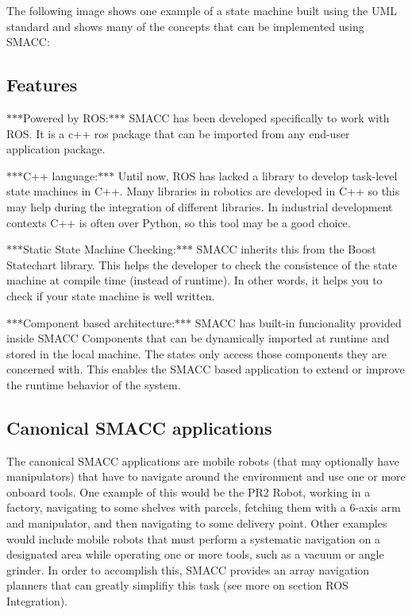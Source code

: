 The following image shows one example of a state machine built using the U\+ML standard and shows many of the concepts that can be implemented using S\+M\+A\+CC\+: 

 

\subsection*{Features}


\begin{DoxyItemize}
\item $\ast$$\ast$$\ast$\+Powered by R\+OS\+:$\ast$$\ast$$\ast$ S\+M\+A\+CC has been developed specifically to work with R\+OS. It is a c++ ros package that can be imported from any end-\/user application package.
\item $\ast$$\ast$$\ast$\+C++ language\+:$\ast$$\ast$$\ast$ Until now, R\+OS has lacked a library to develop task-\/level state machines in C++. Many libraries in robotics are developed in C++ so this may help during the integration of different libraries. In industrial development contexts C++ is often over Python, so this tool may be a good choice.
\item $\ast$$\ast$$\ast$\+Static State Machine Checking\+:$\ast$$\ast$$\ast$ S\+M\+A\+CC inherits this from the Boost Statechart library. This helps the developer to check the consistence of the state machine at compile time (instead of runtime). In other words, it helps you to check if your state machine is well written.
\item $\ast$$\ast$$\ast$\+Component based architecture\+:$\ast$$\ast$$\ast$ S\+M\+A\+CC has built-\/in funcionality provided inside S\+M\+A\+CC Components that can be dynamically imported at runtime and stored in the local machine. The states only access those components they are concerned with. This enables the S\+M\+A\+CC based application to extend or improve the runtime behavior of the system.
\end{DoxyItemize}

\subsection*{Canonical S\+M\+A\+CC applications}

The canonical S\+M\+A\+CC applications are mobile robots (that may optionally have manipulators) that have to navigate around the environment and use one or more onboard tools. One example of this would be the P\+R2 Robot, working in a factory, navigating to some shelves with parcels, fetching them with a 6-\/axis arm and manipulator, and then navigating to some delivery point. Other examples would include mobile robots that must perform a systematic navigation on a designated area while operating one or more tools, such as a vacuum or angle grinder. In order to accomplish this, S\+M\+A\+CC provides an array navigation planners that can greatly simplifiy this task (see more on section R\+OS Integration).

